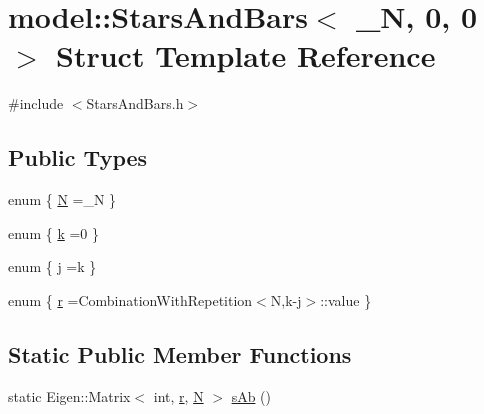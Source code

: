 \hypertarget{structmodel_1_1_stars_and_bars_3_01___n_00_010_00_010_01_4}{}\section{model\+:\+:Stars\+And\+Bars$<$ \+\_\+\+N, 0, 0 $>$ Struct Template Reference}
\label{structmodel_1_1_stars_and_bars_3_01___n_00_010_00_010_01_4}


{\ttfamily \#include $<$Stars\+And\+Bars.\+h$>$}

\subsection*{Public Types}
\begin{DoxyCompactItemize}
\item 
enum \{ \hyperlink{structmodel_1_1_stars_and_bars_3_01___n_00_010_00_010_01_4_a4980ac110787ebdc3f4dabad25a24586a9b4f41b3d528ab168c9a68c1f85d9e7d}{N} =\+\_\+\+N
 \}
\item 
enum \{ \hyperlink{structmodel_1_1_stars_and_bars_3_01___n_00_010_00_010_01_4_a2d19e0cb82b0fbba5249464b6c915ef7a264b32cb2b82e261ea2c9d1ee48f399e}{k} =0
 \}
\item 
enum \{ \hyperlink{structmodel_1_1_stars_and_bars_3_01___n_00_010_00_010_01_4_a2ae5cda8c0a0977de0b4cb7043da29eeac5aee8e1c01e7413ec5d325d58fdad18}{j} =k
 \}
\item 
enum \{ \hyperlink{structmodel_1_1_stars_and_bars_3_01___n_00_010_00_010_01_4_a5a90ed543f0cf4010436e85d0878cbc0ad15f0b782d718bcda7f96e5b28210b71}{r} =Combination\+With\+Repetition$<$N,k-\/j$>$\+:\+:value
 \}
\end{DoxyCompactItemize}
\subsection*{Static Public Member Functions}
\begin{DoxyCompactItemize}
\item 
static Eigen\+::\+Matrix$<$ int, \hyperlink{structmodel_1_1_stars_and_bars_3_01___n_00_010_00_010_01_4_a5a90ed543f0cf4010436e85d0878cbc0ad15f0b782d718bcda7f96e5b28210b71}{r}, \hyperlink{structmodel_1_1_stars_and_bars_3_01___n_00_010_00_010_01_4_a4980ac110787ebdc3f4dabad25a24586a9b4f41b3d528ab168c9a68c1f85d9e7d}{N} $>$ \hyperlink{structmodel_1_1_stars_and_bars_3_01___n_00_010_00_010_01_4_a40d2ae7c5b7b0263088d5495a7e2b5f7}{s\+Ab} ()
\end{DoxyCompactItemize}


